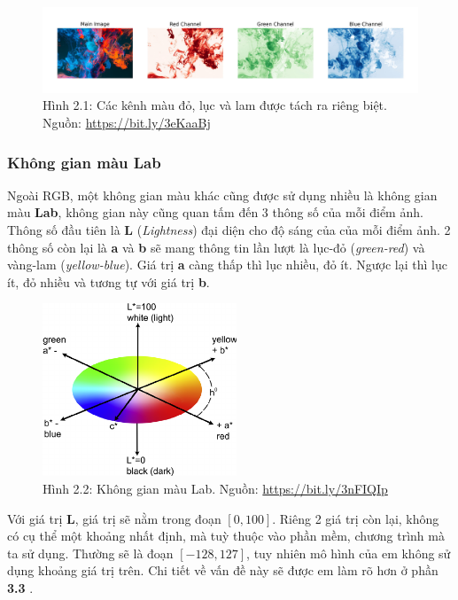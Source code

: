 \documentclass[a4paper]{article}
\begin{document}
\begin{figure}[h!]
\centering
\includegraphics[width=16.1cm]{images/2_1.jpeg}
\caption{Hình 2.1: Các kênh màu đỏ, lục và lam được tách ra riêng biệt. Nguồn: \href{https://bit.ly/3eKaaBj}{https://bit.ly/3eKaaBj}}
\end{figure}

\subsubsection{Không gian màu Lab}
Ngoài RGB, một không gian màu khác cũng được sử dụng nhiều là không gian màu \textbf{Lab}, không gian này cũng quan tấm đến 3 thông số của mỗi điểm ảnh. Thông số đầu tiên là \textbf{L} (\textit{Lightness}) đại diện cho độ sáng của của mỗi điểm ảnh. 2 thông số còn lại là \textbf{a} và \textbf{b} sẽ mang thông tin lần lượt là lục-đỏ (\textit{green-red}) và vàng-lam (\textit{yellow-blue}). Giá trị \textbf{a} càng thấp thì lục nhiều, đỏ ít. Ngược lại thì lục ít, đỏ nhiều và tương tự với giá trị \textbf{b}.

\begin{figure}[h!]
\centering
\includegraphics[width=5.8cm]{images/2_2.png}
\caption{Hình 2.2: Không gian màu Lab. Nguồn: \href{https://bit.ly/3nFIQIp}{https://bit.ly/3nFIQIp}}
\end{figure}

\noindent
Với giá trị \textbf{L}, giá trị sẽ nằm trong đoạn $[0, 100]$. Riêng 2 giá trị còn lại, không có cụ thể một khoảng nhất định, mà tuỳ thuộc vào phần mềm, chương trình mà ta sử dụng. Thường sẽ là đoạn $[-128, 127]$, tuy nhiên mô hình của em không sử dụng khoảng giá trị trên. Chi tiết về vấn đề này sẽ được em làm rõ hơn ở phần \textbf{3.3 }.
\end{document}
